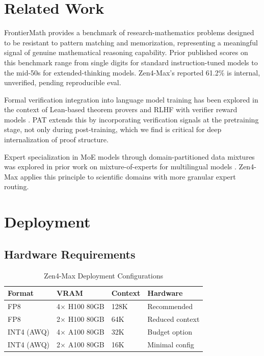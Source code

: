 \documentclass[11pt,a4paper]{article}
\begin{document}
\section{Related Work}

FrontierMath \cite{glazer2024frontiermath} provides a benchmark of research-mathematics
problems designed to be resistant to pattern matching and memorization, representing a
meaningful signal of genuine mathematical reasoning capability. Prior published scores on
this benchmark range from single digits for standard instruction-tuned models to the
mid-50s for extended-thinking models. Zen4-Max's reported 61.2\% is internal, unverified, pending reproducible eval.

Formal verification integration into language model training has been explored in the
context of Lean-based theorem provers \cite{polu2022formal} and RLHF with verifier reward
models \cite{lightman2023let}. PAT extends this by incorporating verification signals at
the pretraining stage, not only during post-training, which we find is critical for
deep internalization of proof structure.

Expert specialization in MoE models through domain-partitioned data mixtures was explored
in prior work on mixture-of-experts for multilingual models \cite{artetxe2021efficient}.
Zen4-Max applies this principle to scientific domains with more granular expert routing.

\section{Deployment}

\subsection{Hardware Requirements}

\begin{table}[H]
\centering
\begin{tabular}{llll}
\toprule
\textbf{Format} & \textbf{VRAM} & \textbf{Context} & \textbf{Hardware} \\
\midrule
FP8              & 4$\times$ H100 80GB & 128K & Recommended \\
FP8              & 2$\times$ H100 80GB & 64K  & Reduced context \\
INT4 (AWQ)       & 4$\times$ A100 80GB & 32K  & Budget option \\
INT4 (AWQ)       & 2$\times$ A100 80GB & 16K  & Minimal config \\
\bottomrule
\end{tabular}
\caption{Zen4-Max Deployment Configurations}
\end{table}
\end{document}
